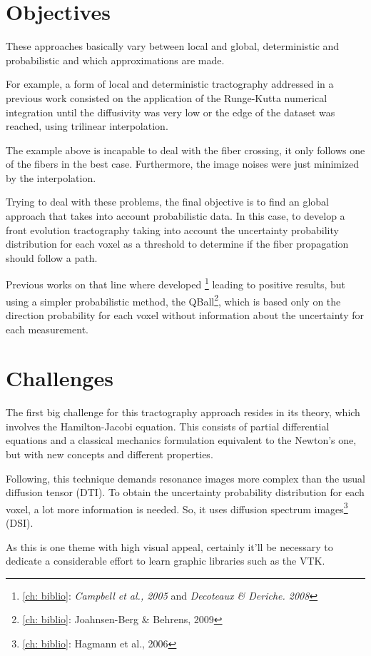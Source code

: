 \documentclass[a4paper,11pt]{report}
\begin{document}
  \section{Objectives}
  These approaches basically vary between local and global, deterministic and probabilistic and which approximations are made.

  For example, a form of local and deterministic tractography addressed in a previous work consisted on the application of the Runge-Kutta numerical integration until the diffusivity was very low or the edge of the dataset was reached, using trilinear interpolation.

  The example above is incapable to deal with the fiber crossing, it only follows one of the fibers in the best case. Furthermore, the image noises were just minimized by the interpolation.

  Trying to deal with these problems, the final objective is to find an global approach that takes into account probabilistic data. In this case, to develop a front evolution tractography taking into account the uncertainty probability distribution for each voxel as a threshold to determine if the fiber propagation should follow a path.

  Previous works on that line where developed \footnote{\ref{ch: biblio}: \textit{Campbell et al., 2005} and \textit{Decoteaux \& Deriche. 2008}} leading to positive results, but using a simpler probabilistic method, the QBall\footnote{\ref{ch: biblio}: Joahnsen-Berg \& Behrens, 2009}, which is based only on the direction probability for each voxel without information about the uncertainty for each measurement.

  \section{Challenges}
  The first big challenge for this tractography approach resides in its theory, which involves the Hamilton-Jacobi equation. This consists of partial differential equations and a classical mechanics formulation equivalent to the Newton's one, but with new concepts and different properties.

  Following, this technique demands resonance images more complex than the usual diffusion tensor (DTI). To obtain the uncertainty probability distribution for each voxel, a lot more information is needed. So, it uses diffusion spectrum images\footnote{\ref{ch: biblio}: Hagmann et al., 2006} (DSI).

  As this is one theme with high visual appeal, certainly it'll be necessary to dedicate a considerable effort to learn graphic libraries such as the VTK.
\end{document}
